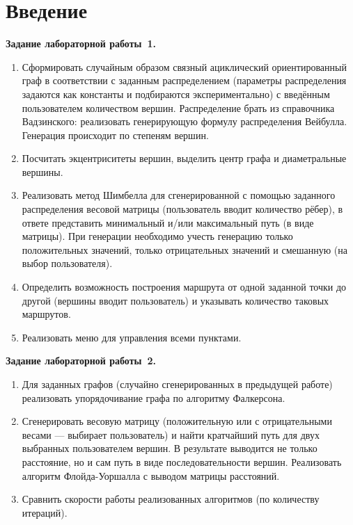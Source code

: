 \section*{Введение}

\textbf{Задание лабораторной работы~1.}
\begin{enumerate}
    \item Сформировать случайным образом связный ациклический ориентированный граф
    в соответствии с заданным распределением (параметры распределения задаются как
    константы и подбираются экспериментально) с введённым пользователем количеством
    вершин. Распределение брать из справочника Вадзинского: реализовать генерирующую
    формулу распределения Вейбулла. Генерация происходит по степеням вершин.

    \item Посчитать экцентриситеты вершин, выделить центр графа и диаметральные вершины.

    \item Реализовать метод Шимбелла для сгенерированной с помощью заданного распределения
    весовой матрицы (пользователь вводит количество рёбер), в ответе представить минимальный
    и/или максимальный путь (в виде матрицы). При генерации необходимо учесть генерацию
    только положительных значений, только отрицательных значений и смешанную (на выбор
    пользователя).

    \item Определить возможность построения маршрута от одной заданной точки до другой
    (вершины вводит пользователь) и указывать количество таковых маршрутов.

    \item Реализовать меню для управления всеми пунктами.
\end{enumerate}

\textbf{Задание лабораторной работы~2.}
\begin{enumerate}
    \item Для заданных графов (случайно сгенерированных в предыдущей работе)
    реализовать упорядочивание графа по алгоритму Фалкерсона.

    \item Сгенерировать весовую матрицу (положительную или с отрицательными весами ---
    выбирает пользователь) и найти кратчайший путь для двух выбранных пользователем
    вершин. В результате выводится не только расстояние, но и сам путь в виде
    последовательности вершин. Реализовать алгоритм Флойда-Уоршалла с выводом матрицы
    расстояний.

    \item Сравнить скорости работы реализованных алгоритмов (по количеству итераций).
\end{enumerate}

